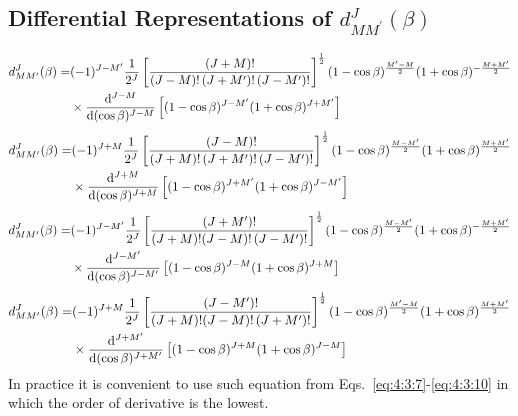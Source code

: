 \subsection{Differential Representations of $d_{M M^{\prime}}^{J}(\beta)$}\label{sec:4.3.2}
\begin{align}
 d_{M M^{\prime}}^{J}(\beta)=&(-1)^{J-M^{\prime}} \frac{1}{2^{J}}\left[\frac{(J+M)!}{(J-M)!\left(J+M^{\prime}\right)!\left(J-M^{\prime}\right)!}\right]^{\frac{1}{2}}(1-\cos \beta)^{\frac{M^{\prime}-M}{2}}(1+\cos \beta)^{-\frac{M+M^{\prime}}{2}}  \notag\\
& \times \frac{\mathrm{d}^{J-M}}{\mathrm{d} (\cos \beta)^{J-M}}\left[(1-\cos \beta)^{J-M^{\prime}}(1+\cos \beta)^{J+M^{\prime}}\right]  \label{eq:4:3:7}
\end{align}
\begin{align}
 d_{M M^{\prime}}^{J}(\beta)=&(-1)^{J+M} \frac{1}{2^{J}}\left[\frac{(J-M)!}{(J+M)!\left(J+M^{\prime}\right)!\left(J-M^{\prime}\right)!}\right]^{\frac{1}{2}}(1-\cos \beta)^{\frac{M-M^{\prime}}{2}}(1+\cos \beta)^{\frac{M+M^{\prime}}{2}}  \notag\\
& \times \frac{\mathrm{d}^{J+M}}{\mathrm{d} (\cos \beta)^{J+M}}\left[(1-\cos \beta)^{J+M^{\prime}}(1+\cos \beta)^{J-M^{\prime}}\right]  \label{eq:4:3:8}
\end{align}
\begin{align}
 d_{M M^{\prime}}^{J}(\beta)=&(-1)^{J-M^{\prime}} \frac{1}{2^{J}}\left[\frac{\left(J+M^{\prime}\right)!}{(J+M)!(J-M)!\left(J-M^{\prime}\right)!}\right]^{\frac{1}{2}}(1-\cos \beta)^{\frac{M-M^{\prime}}{2}}(1+\cos \beta)^{-\frac{M+M^{\prime}}{2}}  \notag\\
& \times \frac{\mathrm{d}^{J-M^{\prime}}}{\mathrm{d} (\cos \beta)^{J-M^{\prime}}}\left[(1-\cos \beta)^{J-M}(1+\cos \beta)^{J+M}\right]  \label{eq:4:3:9}
\end{align}
\begin{align}
 d_{M M^{\prime}}^{J}(\beta)=&(-1)^{J+M} \frac{1}{2^{J}}\left[\frac{\left(J-M^{\prime}\right)!}{(J+M)!(J-M)!\left(J+M^{\prime}\right)!}\right]^{\frac{1}{2}}(1-\cos \beta)^{\frac{M^{\prime}-M}{2}}(1+\cos \beta)^{\frac{M+M^{\prime}}{2}}  \notag\\
& \times \frac{\mathrm{d}^{J+M^{\prime}}}{\mathrm{d} (\cos \beta)^{J+M^{\prime}}}\left[(1-\cos \beta)^{J+M}(1+\cos \beta)^{J-M}\right] \label{eq:4:3:10}
\end{align}
In practice it is convenient to use such equation from Eqs.~\eqref{eq:4:3:7}-\eqref{eq:4:3:10} in which the order of derivative is the lowest.

